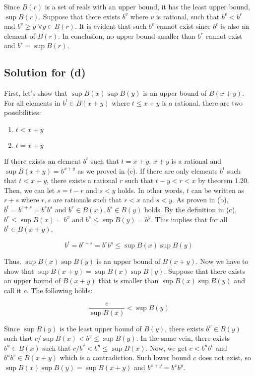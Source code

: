 \documentclass{scrartcl}
\begin{document}
Since \(B(r)\) is a set of reals with an upper bound, it has the least upper bound, \(\sup B(r)\).
Suppose that there exists \(b^v\) where \(v\) is rational, such that \(b^v < b^r\) and \(b^v \geq y \; \forall y \in B(r)\).
It is evident that such \(b^v\) cannot exist since \(b^r\) is also an element of \(B(r)\).
In conclusion, no upper bound smaller than \(b^r\) cannot exist and \(b^r = \sup B(r)\).

\subsection{Solution for (d)}
First, let's show that \(\sup B(x)\sup B(y)\) is an upper bound of \(B(x + y)\).
For all elements in \(b^t \in B(x + y)\) where \(t \leq x + y\) is a rational, there are two possibilities:

\begin{enumerate}
  \item \(t < x + y\)
  \item \(t = x + y\)
\end{enumerate}

If there exists an element \(b^t\) such that \(t = x + y\), \(x + y\) is a rational and \(\sup B(x + y) = b^{x + y}\) as we proved in (c).
If there are only elements \(b^t\) such that \(t < x + y\), there exists a rational \(r\) such that \(t - y < r < x\) by theorem 1.20.
Then, we can let \(s = t - r\) and \(s < y\) holds.
In other words, \(t\) can be written as \(r + s\) where \(r, s\) are rationals such that \(r < x\) and \(s < y\).
As proven in (b), \(b^t = b^{r + s} = b^r b^s\) and \(b^r \in B(x), b^s \in B(y)\) holds.
By the definition in (c), \(b^r \leq \sup B(x) = b^x\) and \(b^s \leq \sup B(y) = b^y\).
This implies that for all \(b^t \in B(x + y)\),

\[
  b^t = b^{r + s} = b^r b^s \leq \sup B(x) \sup B(y)
\]

Thus, \(\sup B(x) \sup B(y)\) is an upper bound of \(B(x + y)\).
Now we have to show that \(\sup B(x + y) = \sup B(x) \sup B(y)\).
Suppose that there exists an upper bound of \(B(x + y)\) that is smaller than \(\sup B(x) \sup B(y)\) and call it \(c\).
The following holds:

\[
  \frac{c}{\sup B(x)} < \sup B(y)
\]

Since \(\sup B(y)\) is the least upper bound of \(B(y)\), there exists \(b^v \in B(y)\) such that \(c / \sup B(x) < b^v \leq \sup B(y)\).
In the same vein, there exists \(b^u \in B(x)\) such that \(c / b^v < b^u \leq \sup B(x)\).
Now, we get \(c < b^u b^v\) and \(b^u b^v \in B(x + y)\) which is a contradiction.
Such lower bound \(c\) does not exist, so \(\sup B(x) \sup B(y) = \sup B(x + y)\) and \(b^{x + y} = b^x b^y\).
\end{document}
